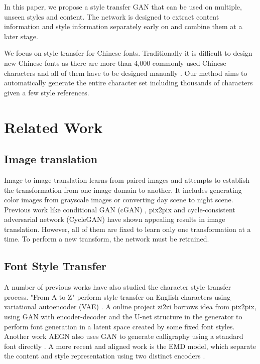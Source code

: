 \documentclass[10pt,twocolumn,letterpaper]{article}
\begin{document}
In this paper, we propose a style transfer GAN that can be used on multiple, unseen styles and content. The network is designed to extract content information and style information separately early on and combine them at a later stage. 

We focus on style transfer for Chinese fonts. Traditionally it is difficult to design new Chinese fonts as there are more than 4,000 commonly used Chinese characters and all of them have to be designed manually \cite{Authors02}. Our method aims to automatically generate the entire character set including thousands of characters given a few style references.

\section{Related Work}

\subsection{Image translation}
Image-to-image translation learns from paired images and attempts to establish the transformation from one image domain to another. It includes generating color images from grayscale images or converting day scene to night scene. Previous work like conditional GAN (cGAN) \cite{Authors01}, pix2pix\cite{DBLP:journals/corr/IsolaZZE16} and cycle-consistent adversarial network (CycleGAN)\cite{DBLP:journals/corr/ZhuPIE17} have shown appealing results in image translation. However, all of them are fixed to learn only one transformation at a time. To perform a new transform, the network must be retrained.

\subsection{Font Style Transfer}
A number of previous works have also studied the character style transfer process. "From A to Z" perform style transfer on English characters using variational autoencoder (VAE) \cite{DBLP:journals/corr/UpchurchSB16}. A online project zi2zi\cite{zi2zi} borrows idea from pix2pix, using GAN with encoder-decoder and the U-net structure in the generator to perform font generation in a latent space created by some fixed font styles. Another work AEGN also uses GAN to generate calligraphy using a standard font directly \cite{DBLP:journals/corr/LyuBYZHL17}. A more recent and aligned work is the EMD model, which separate the content and style representation using two distinct encoders \cite{DBLP:journals/corr/abs-1711-06454}. 
\end{document}
